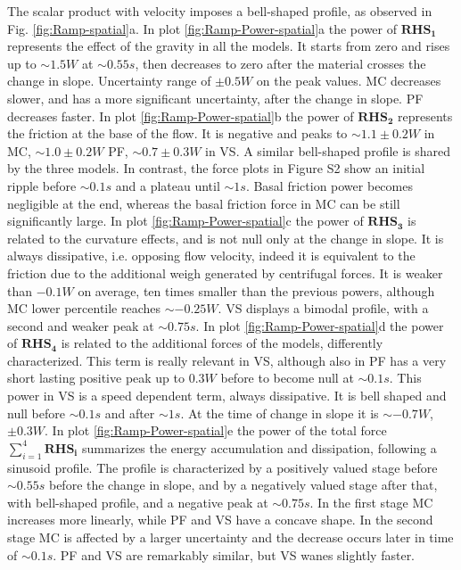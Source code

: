\documentclass{article}
\begin{document}
The scalar product with velocity imposes a bell-shaped profile, as observed in Fig. \ref{fig:Ramp-spatial}a. In plot \ref{fig:Ramp-Power-spatial}a the power of $\boldsymbol{RHS_1}$ represents the effect of the gravity in all the models. It starts from zero and rises up to $\sim 1.5 W$ at $\sim 0.55 s$, then decreases to zero after the material crosses the change in slope. Uncertainty range of $\pm 0.5 W$ on the peak values. MC decreases slower, and has a more significant uncertainty, after the change in slope. PF decreases faster.  In plot \ref{fig:Ramp-Power-spatial}b the power of  $\boldsymbol{RHS_2}$ represents the friction at the base of the flow. It is negative and peaks to $\sim 1.1 \pm 0.2 W$ in MC, $\sim 1.0 \pm 0.2 W$ PF, $\sim 0.7 \pm 0.3 W$ in VS. A similar bell-shaped profile is shared by the three models. In contrast, the force plots in Figure S2 show an initial ripple before $\sim 0.1 s$ and a plateau until $\sim 1 s$. Basal friction power becomes negligible at the end, whereas the basal friction force in MC can be still significantly large. In plot \ref{fig:Ramp-Power-spatial}c the power of $\boldsymbol{RHS_3}$ is related to the curvature effects, and is not null only at the change in slope. It is always dissipative, i.e. opposing flow velocity, indeed it is equivalent to the friction due to the additional weigh generated by centrifugal forces. It is weaker than $-0.1 W$ on average, ten times smaller than the previous powers, although MC lower percentile reaches $\sim -0.25 W$. VS displays a bimodal profile, with a second and weaker peak at $\sim 0.75 s$. In plot \ref{fig:Ramp-Power-spatial}d the power of $\boldsymbol{RHS_4}$ is related to the additional forces of the models, differently characterized. This term is really relevant in VS, although also in PF has a very short lasting positive peak up to $0.3 W$ before to become null at $\sim 0.1 s$. This power in VS is a speed dependent term, always dissipative. It is bell shaped and null before $\sim 0.1 s$ and after $\sim 1 s$. At the time of change in slope it is $\sim -0.7 W$, $\pm 0.3 W$. In plot \ref{fig:Ramp-Power-spatial}e the power of the total force $\sum^4_{i=1}\boldsymbol{RHS_i}$ summarizes the energy accumulation and dissipation, following a sinusoid profile. The profile is characterized by a positively valued stage before $\sim 0.55 s$ before the change in slope, and by a negatively valued stage after that, with bell-shaped profile, and a negative peak at $\sim 0.75 s$. In the first stage MC increases more linearly, while PF and VS have a concave shape. In the second stage MC is affected by a larger uncertainty and the decrease occurs later in time of $\sim 0.1 s$. PF and VS are remarkably similar, but VS wanes slightly faster.
\end{document}
